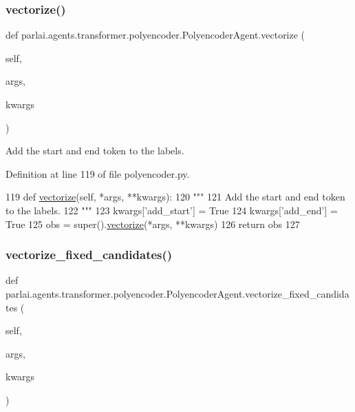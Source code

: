 \subsubsection{\texorpdfstring{vectorize()}{vectorize()}}
{\footnotesize\ttfamily def parlai.\+agents.\+transformer.\+polyencoder.\+Polyencoder\+Agent.\+vectorize (\begin{DoxyParamCaption}\item[{}]{self,  }\item[{}]{args,  }\item[{}]{kwargs }\end{DoxyParamCaption})}

\begin{DoxyVerb}Add the start and end token to the labels.
\end{DoxyVerb}
 

Definition at line 119 of file polyencoder.\+py.


\begin{DoxyCode}
119     \textcolor{keyword}{def }\hyperlink{namespaceparlai_1_1agents_1_1drqa_1_1utils_a5c76cc39e3014c7bcf9199d566dbdc0f}{vectorize}(self, *args, **kwargs):
120         \textcolor{stringliteral}{"""}
121 \textcolor{stringliteral}{        Add the start and end token to the labels.}
122 \textcolor{stringliteral}{        """}
123         kwargs[\textcolor{stringliteral}{'add\_start'}] = \textcolor{keyword}{True}
124         kwargs[\textcolor{stringliteral}{'add\_end'}] = \textcolor{keyword}{True}
125         obs = super().\hyperlink{namespaceparlai_1_1agents_1_1drqa_1_1utils_a5c76cc39e3014c7bcf9199d566dbdc0f}{vectorize}(*args, **kwargs)
126         \textcolor{keywordflow}{return} obs
127 
\end{DoxyCode}
\mbox{\label{classparlai_1_1agents_1_1transformer_1_1polyencoder_1_1PolyencoderAgent_ad002f52bc5bfbe8269983bbfc0988f98}} 
\subsubsection{\texorpdfstring{vectorize\+\_\+fixed\+\_\+candidates()}{vectorize\_fixed\_candidates()}}
{\footnotesize\ttfamily def parlai.\+agents.\+transformer.\+polyencoder.\+Polyencoder\+Agent.\+vectorize\+\_\+fixed\+\_\+candidates (\begin{DoxyParamCaption}\item[{}]{self,  }\item[{}]{args,  }\item[{}]{kwargs }\end{DoxyParamCaption})}

